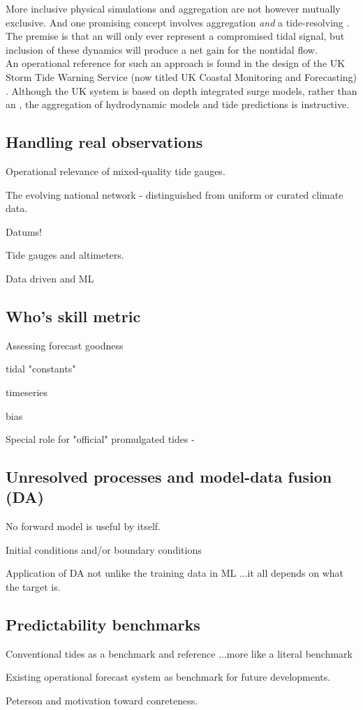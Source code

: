 More inclusive physical simulations and aggregation are not however mutually exclusive.  
And one promising concept involves aggregation \emph{and} a tide-resolving \OGCM{}.  The premise is that an \OGCM{} will only ever represent a compromised tidal signal, but inclusion of these dynamics will produce a net gain for the nontidal flow.\\
An operational reference for such an approach is found in the design of the UK Storm Tide Warning Service (now titled UK Coastal Monitoring and Forecasting) \cite{Horsburg:2009ui}.   Although the UK system is based on depth integrated surge models, rather than an \OGCM{}, the aggregation of hydrodynamic models and tide predictions is instructive.\\   

\subsection{Handling real observations}
Operational relevance of mixed-quality tide gauges.

The evolving national network - distinguished from uniform or curated climate data.


Datums!

Tide gauges and altimeters.    


Data driven and ML


\subsection{Who's skill metric}
Assessing forecast goodness

tidal "constants"

timeseries

bias

Special role for "official" promulgated tides - 


\subsection{Unresolved processes and model-data fusion (DA)}
No forward model is useful by itself.

Initial conditions and/or boundary conditions 

Application of DA not unlike the training data in ML ...it all depends on what the target is.



\subsection{Predictability benchmarks}

Conventional tides as a benchmark and reference ...more like a literal benchmark


Existing operational forecast system as benchmark for future developments.


Peterson and motivation toward conreteness.





